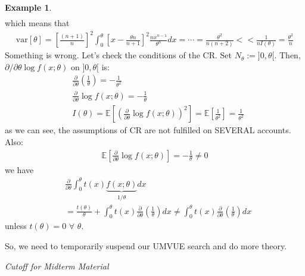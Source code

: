 \documentclass[11pt]{scrartcl}
\theoremstyle{definition}
\newtheorem{ex}{Example}
\theoremstyle{remark}
\newcommand{\EX}[1]{\mathbb{E}\left[#1 \right]}
\newcommand{\idx}[2]{\int_{#1}^{#2}}
\begin{document}
{\begin{ex}
\begin{align*}
	\end{align*}
	which means that 
	\begin{align*}
		\text{var}[\theta] = \left[ 	 \frac{(n+1)}{n}	 \right]^2 \idx{0}{\theta} \left[ x - \frac{\theta n}{n+1}	\right]^2 \frac{nx^{n-1}}{\theta^n} dx   = \cdots = \frac{\theta^2}{n(n+2)} << \frac{1}{nI(\theta)} = \frac{\theta^2}{n}
	\end{align*}
	Something is wrong. Let's check the conditions of the CR. Set $N_\theta := ]0, \theta[$. Then, $\partial / \partial \theta \log f(x; \theta)$ on $]0, \theta[$ is: 
	\begin{align*}
		& \frac{\partial}{\partial \theta} \left( 	\frac{1}{\theta}	\right) = - \frac{1}{\theta^2} \\
		& \frac{\partial}{\partial \theta} \log f(x; \theta) = - \frac{1}{\theta} \\
		& I(\theta) = \EX{ \left( 	\frac{\partial}{\partial \theta} \log f(x; \theta)	 \right)^2  } = \EX{\frac{1}{\theta^2}}  = \frac{1}{\theta^2}
	\end{align*}
	as we can see, the assumptions of CR are not fulfilled on SEVERAL accounts. Also: 
	\begin{align*}
		\EX{\frac{\partial}{\partial \theta} \log f(x; \theta)} = - \frac{1}{\theta} \neq 0 
	\end{align*}
	we have 
	\begin{align*}
		& \frac{\partial}{\partial \theta} \idx{0}{\theta} t(x) \underbrace{f(x; \theta)}_{1/ \theta} dx \\
		& = \frac{t(\theta)}{\theta} + \idx{0}{\theta} t(x) \frac{\partial}{\partial \theta} \left( \frac{1}{\theta} \right) dx \neq \idx{0}{\theta} t(x) \frac{\partial}{\partial \theta} \left( \frac{1}{\theta} \right) dx 
	\end{align*}
	unless $t(\theta) = 0$ $\forall$ $\theta$. 
\end{ex}

So, we need to temporarily suspend our UMVUE search and do more theory.

\emph{Cutoff for Midterm Material} 
}
\end{document}
